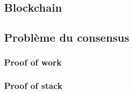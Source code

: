 \subsection{Blockchain}

\subsection{Problème du consensus}
\subsubsection{Proof of work}
\subsubsection{Proof of stack}

